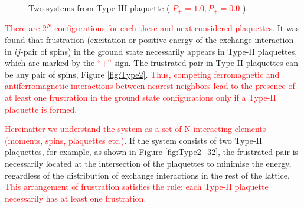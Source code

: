 \documentclass[preprint,12pt]{elsarticle}
\begin{document}
\begin{figure}[H]
\begin{minipage}[t]{0.3\textwidth}
			\caption{Two systems from Type-III plaquette (\textcolor{red}{  $P_+=1.0, P_+=0.0$ }).}
			\label{fig:Type3}
		\end{minipage}
	\end{figure}
	
	
	\textcolor{red}{There are $2^N$ configurations for each these and next considered plaquettes.}
	It was found that frustration (excitation or positive energy of the exchange interaction in $ij$-pair of spins) in the ground state necessarily appears in Type-II plaquettes, which are marked by the \textcolor{red}{``$+$''} sign. The frustrated pair in Type-II plaquettes can be any pair of spins, Figure \ref{fig:Type2}. \textcolor{red}{Thus, competing ferromagnetic and antiferromagnetic interactions between nearest neighbors lead to the presence of at least one frustration in the ground state configurations only if a Type-II plaquette is formed.}
	
	\textcolor{red}{Hereinafter we understand the system as a set of N interacting elements (moments, spins, plaquettes etc.).} If the system consists of two Type-II plaquettes, for example, as shown in Figure \ref{fig:Type2_32}, the frustrated pair is necessarily located at the intersection of the plaquettes to minimise the energy, regardless of the distribution of exchange interactions in the rest of the lattice. \textcolor{red}{This arrangement of frustration satisfies the rule: each Type-II plaquette necessarily has at least one frustration.}
	
\end{document}
